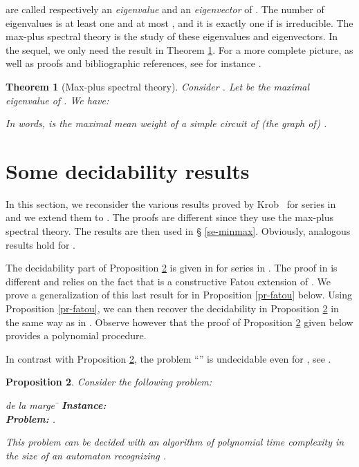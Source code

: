 \documentclass{article}
\newtheorem{thrm}{Theorem}[section]
\newtheorem{prpstn}[thrm]{Proposition}
\newcommand{\1}{\mathbb{1}}
\newcommand{\0}{\mathbb{0}}
\begin{document}
are called respectively an {\em eigenvalue} and an {\em
  eigenvector} of . 
The number of eigenvalues is at least one and at most
  , and it is exactly one if  is irreducible. 
The max-plus spectral theory is the study of
  these eigenvalues and eigenvectors. 
In the sequel, we only need the result in Theorem \ref{th-spectral}.
For a more complete picture, as
  well as proofs and bibliographic references, see for instance \cite{BCOQ}. 

\begin{thrm}[Max-plus spectral theory]\label{th-spectral}
Consider . Let   be the maximal eigenvalue
of . We have:

In words,  is the maximal mean weight of a simple circuit of
(the graph of) . \end{thrm}

\section{Some decidability results}\label{se-krob}

In this section, we reconsider the various results proved by
Krob~\cite{krob94} for series in  and we extend
them to . The proofs are different since they use
the max-plus spectral theory. The results are then used in \S
\ref{se-minmax}. Obviously, analogous results hold for . 

\medskip

The decidability part of Proposition \ref{pr-ineq} is
given in \cite[Corollary 4.3]{krob94} for
series in .
The proof in \cite{krob94} is different and relies
on the fact that  is a constructive Fatou
extension of . We prove a generalization of
this last 
result for   in Proposition
\ref{pr-fatou} below. Using Proposition \ref{pr-fatou}, we can then 
recover the decidability in Proposition \ref{pr-ineq} in the same way
as in \cite{krob94}. 
Observe however that the proof of Proposition \ref{pr-ineq} 
given below provides a polynomial
procedure. 

In contrast with Proposition \ref{pr-ineq}, the problem ``'' is undecidable even for , see
\cite{krob}. 

\begin{prpstn}
\label{pr-ineq}
Consider the following problem:
\begin{tabbing} 
de la marge \= \kill
\> {\bf Instance:} \hspace*{0.4cm} \=  \\
\>  {\bf Problem:} \>  \:.
\end{tabbing}
This problem can be decided with an algorithm of polynomial time
complexity in the size of an automaton recognizing . 
\end{prpstn}
\end{document}
